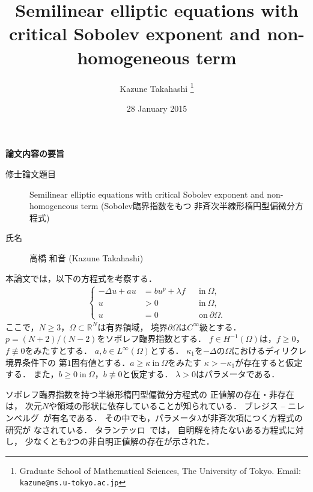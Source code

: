 \documentclass{jsarticle}
\title{Semilinear elliptic equations with critical Sobolev exponent and non-homogeneous term}
\author{Kazune Takahashi \thanks{Graduate School of Mathematical
Sciences, The University of Tokyo. Email: \texttt{kazune@ms.u-tokyo.ac.jp}}}
\date{28 January 2015}
\theoremstyle{plain}
\newcommand{\R}{\mathbb{R}}
\newcommand{\tin}{\text{in}~}
\newcommand{\ton}{\text{on}~}
\begin{document}
{\Large

\begin{center}
 \LARGE
 {\bf 論文内容の要旨}
\end{center}

\begin{description}
 \item[修士論文題目] Semilinear elliptic equations with critical
            Sobolev exponent and non-homogeneous term (Sobolev臨界指数をもつ
            非斉次半線形楕円型偏微分方程式)
 \item[氏名] 高橋 和音 (Kazune Takahashi)
\end{description}
}

本論文では，以下の方程式を考察する．
\begin{align}
 \left\{
 \begin{aligned}
  -\Delta u + a u &= b u^p + \lambda f  & &\tin \Omega,  \\
  u &> 0 & &\tin \Omega, \\
  u &= 0 & &\ton \partial\Omega.
 \end{aligned}
 \right. \tag*{$(\spadesuit)_\lambda$} \label{eq:prob_main}
\end{align}
ここで，$N \geq 3$，$\Omega \subset \R^N$は有界領域，
境界$\partial \Omega$は$C^\infty$級とする．
$p = (N+2)/(N-2)$をソボレフ臨界指数とする．
$f \in H^{-1}(\Omega)$は，$f \geq 0$，
$f \not \equiv 0$をみたすとする．
$a, b \in L^\infty(\Omega)$とする．
$\kappa_1$を$-\Delta$の$\Omega$におけるディリクレ境界条件下の
第$1$固有値とする．$a \geq \kappa ~\tin \Omega$をみたす
$\kappa > - \kappa_1$が存在すると仮定する．
また，$b \geq 0 ~\tin \Omega$，$b \not \equiv 0$と仮定する．
$\lambda > 0$はパラメータである．

ソボレフ臨界指数を持つ半線形楕円型偏微分方程式の
正値解の存在・非存在は，
次元$N$や領域の形状に依存していることが知られている．
ブレジス -- ニレンベルグ\cite{MR709644}~が有名である．
その中でも，パラメータ$\lambda$が非斉次項につく方程式の研究が
なされている．
タランテッロ\cite{MR1168304}~では，
自明解を持たないある方程式に対し，
少なくとも$2$つの非自明正値解の存在が示された．
\end{document}
